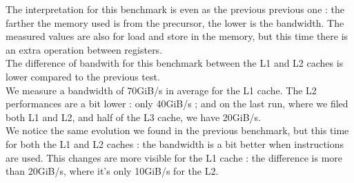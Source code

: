 
The interpretation for this benchmark is even as the previous previous one : the farther the memory used is from the precursor, the lower is the bandwidth. The measured values are also for load and store in the memory, but this time there is an extra operation between registers.\\

The difference of bandwith for this benchmark between the L1 and L2 caches is lower compared to the previous test.\\

We measure a bandwidth of 70GiB/s in average for the L1 cache.
The L2 performances are a bit lower : only 40GiB/s ; and on the last run, where we filed both L1 and L2, and half of the L3 cache, we have 20GiB/s.\\


We notice the same evolution we found in the previous benchmark, but this time for both the L1 and L2 caches : the bandwidth is a bit better when  instructions are used. This changes are more visible for the L1 cache : the difference is more than 20GiB/s, where it's only 10GiB/s for the L2.